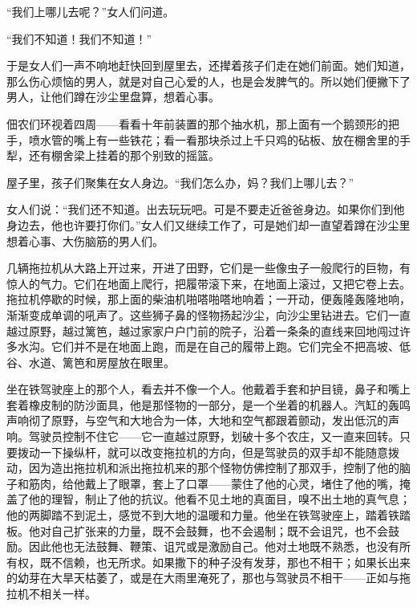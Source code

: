 \documentclass[12pt,UTF-8,openany]{ctexbook}
\begin{document}
\begin{normalsize}
    “我们上哪儿去呢？”女人们问道。
    
    “我们不知道！我们不知道！”
    
    于是女人们一声不响地赶快回到屋里去，还撵着孩子们走在她们前面。她们知道，那么伤心烦恼的男人，就是对自己心爱的人，也是会发脾气的。所以她们便撇下了男人，让他们蹲在沙尘里盘算，想着心事。
    
    佃农们环视着四周——看看十年前装置的那个抽水机，那上面有一个鹅颈形的把手，喷水管的嘴上有一些铁花；看一看那块杀过上千只鸡的砧板、放在棚舍里的手犁，还有棚舍梁上挂着的那个别致的摇篮。
    
    屋子里，孩子们聚集在女人身边。“我们怎么办，妈？我们上哪儿去？”
    
    女人们说：“我们还不知道。出去玩玩吧。可是不要走近爸爸身边。如果你们到他身边去，他也许要打你们。”女人们又继续工作了，可是她们却一直望着蹲在沙尘里想着心事、大伤脑筋的男人们。
    
    几辆拖拉机从大路上开过来，开进了田野，它们是一些像虫子一般爬行的巨物，有惊人的气力。它们在地面上爬行，把履带滚下来，在地面上滚过，又把它卷上去。拖拉机停歇的时候，那上面的柴油机啪嗒啪嗒地响着；一开动，便轰隆轰隆地响，渐渐变成单调的吼声了。这些狮子鼻的怪物扬起沙尘，向沙尘里钻进去。它们一直越过原野，越过篱笆，越过家家户户门前的院子，沿着一条条的直线来回地闯过许多水沟。它们并不是在地面上跑，而是在自己的履带上跑。它们完全不把高坡、低谷、水道、篱笆和房屋放在眼里。
    
    坐在铁驾驶座上的那个人，看去并不像一个人。他戴着手套和护目镜，鼻子和嘴上套着橡皮制的防沙面具，他是那怪物的一部分，是一个坐着的机器人。汽缸的轰鸣声响彻了原野，与空气和大地合为一体，大地和空气都跟着颤动，发出低沉的声响。驾驶员控制不住它——它一直越过原野，划破十多个农庄，又一直来回转。只要拨动一下操纵杆，就可以改变拖拉机的方向，但是驾驶员的双手却不能随意拨动，因为造出拖拉机和派出拖拉机来的那个怪物仿佛控制了那双手，控制了他的脑子和筋肉，给他戴上了眼罩，套上了口罩——蒙住了他的心灵，堵住了他的嘴，掩盖了他的理智，制止了他的抗议。他看不见土地的真面目，嗅不出土地的真气息；他的两脚踏不到泥土，感觉不到大地的温暖和力量。他坐在铁驾驶座上，踏着铁踏板。他对自己扩张来的力量，既不会鼓舞，也不会遏制；既不会诅咒，也不会鼓励。因此他也无法鼓舞、鞭策、诅咒或是激励自己。他对土地既不熟悉，也没有所有权，既不信赖，也无所求。如果撒下的种子没有发芽，那也不相干；如果长出来的幼芽在大旱天枯萎了，或是在大雨里淹死了，那也与驾驶员不相干——正如与拖拉机不相关一样。
    

\end{normalsize}
\end{document}
